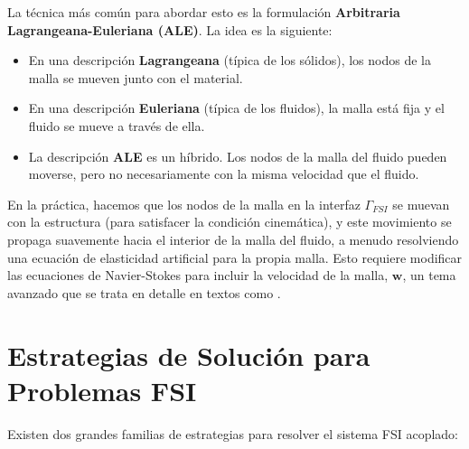 La técnica más común para abordar esto es la formulación \textbf{Arbitraria Lagrangeana-Euleriana (ALE)}. La idea es la siguiente:
\begin{itemize}
    \item En una descripción \textbf{Lagrangeana} (típica de los sólidos), los nodos de la malla se mueven junto con el material.
    \item En una descripción \textbf{Euleriana} (típica de los fluidos), la malla está fija y el fluido se mueve a través de ella.
    \item La descripción \textbf{ALE} es un híbrido. Los nodos de la malla del fluido pueden moverse, pero no necesariamente con la misma velocidad que el fluido.
\end{itemize}
En la práctica, hacemos que los nodos de la malla en la interfaz \(\Gamma_{FSI}\) se muevan con la estructura (para satisfacer la condición cinemática), y este movimiento se propaga suavemente hacia el interior de la malla del fluido, a menudo resolviendo una ecuación de elasticidad artificial para la propia malla. Esto requiere modificar las ecuaciones de Navier-Stokes para incluir la velocidad de la malla, \(\bm{w}\), un tema avanzado que se trata en detalle en textos como \cite{Zienkiewicz2014}.

\section{Estrategias de Solución para Problemas FSI}
\label{sec:fsi-strategy}
Existen dos grandes familias de estrategias para resolver el sistema FSI acoplado:

